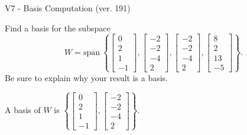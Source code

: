 \begin{exercise}
  \begin{exerciseTitle}V7 - Basis Computation (ver. 191)\end{exerciseTitle}
  \begin{exerciseStatement}
    Find a basis for the subspace 
\[W=\mathrm{span}\ \left\{\left[\begin{array}{r}
0 \\
2 \\
1 \\
-1
\end{array}\right] , \left[\begin{array}{r}
-2 \\
-2 \\
-4 \\
2
\end{array}\right] , \left[\begin{array}{r}
-2 \\
-2 \\
-4 \\
2
\end{array}\right] , \left[\begin{array}{r}
8 \\
2 \\
13 \\
-5
\end{array}\right]\right\}.\]
 Be sure to explain why your result is a basis.


  \end{exerciseStatement}
  \begin{exerciseAnswer}
   A basis of \(W\) is  \(\left\{\left[\begin{array}{r}
0 \\
2 \\
1 \\
-1
\end{array}\right] , \left[\begin{array}{r}
-2 \\
-2 \\
-4 \\
2
\end{array}\right]\right\}\).
  


  \end{exerciseAnswer}
\end{exercise}